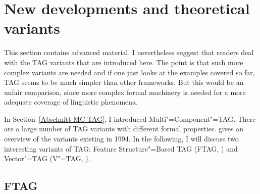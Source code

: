 \section{New developments and theoretical variants}

This section contains advanced material. I nevertheless suggest that readers deal with the TAG
variants that are introduced here. The point is that such more complex variants are needed and if
one just looks at the examples covered so far, TAG seems to be much simpler than other
frameworks. But this would be an unfair comparison, since more complex formal machinery is needed
for a more adequate coverage of linguistic phenomena.

\largerpage
In Section~\ref{Abschnitt-MC-TAG}, I introduced Multi"=Component"=TAG. There are a large number of TAG variants with different formal properties.
\citet[\page
]{Rambow94a} gives an overview of the variants existing in 1994. In the following, I will discuss
two interesting variants of TAG: Feature Structure"=Based TAG (FTAG\indexftag, \citealp{VSJ88a}) and
Vector"=TAG (V"=TAG, \citealp{Rambow94a}). 

\subsection{FTAG}

